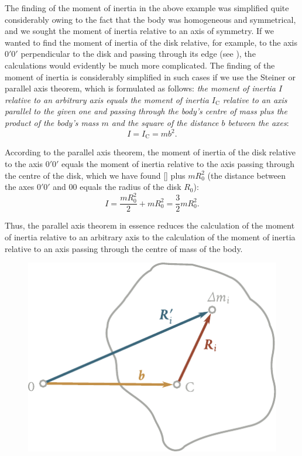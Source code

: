 The finding of the moment of inertia in the above example was simplified quite considerably owing to the fact that the body was homogeneous and symmetrical, and we sought the moment of inertia relative to an axis of symmetry. If we wanted to find the moment of inertia of the disk relative, for example, to the axis $0'0'$ perpendicular to the disk and passing through its edge (see ), the calculations would evidently be much more complicated. The finding of the moment of inertia is considerably simplified in such cases if we use the Steiner or parallel axis theorem, which is formulated as follows: \textit{the moment of inertia $I$ relative to an arbitrary axis equals the moment of inertia $I_{\text{C}}$ relative to an axis parallel to the given one and passing through the body's centre of mass plus the product of the body's mass $m$ and the square of the distance $b$ between the axes}:
\begin{equation}\label{eq:5_23}
I = I_{\text{C}}= mb^2.
\end{equation}

According to the parallel axis theorem, the moment of inertia of the disk relative to the axis $0'0'$ equals the moment of inertia relative to the axis passing through the centre of the disk, which we have found [] plus $mR_0^2$ (the distance between the axes $0'0'$ and $00$ equals the radius of the disk $R_0$):
\begin{equation*}
I = \frac{mR^2_0}{2} + mR_0^2 = \frac{3}{2}mR_0^2.
\end{equation*}

Thus, the parallel axis theorem in essence reduces the calculation of the moment of inertia relative to an arbitrary axis to the calculation of the moment of inertia relative to an axis passing through the centre of mass of the body.

\begin{figure}[t]
	\begin{center}
		\includegraphics[scale=0.93]{figures/ch_05/fig_5_12.pdf}
		\caption[]{}
		\label{fig:5_12}
	\end{center}
\vspace{-1.0cm}
\end{figure}

